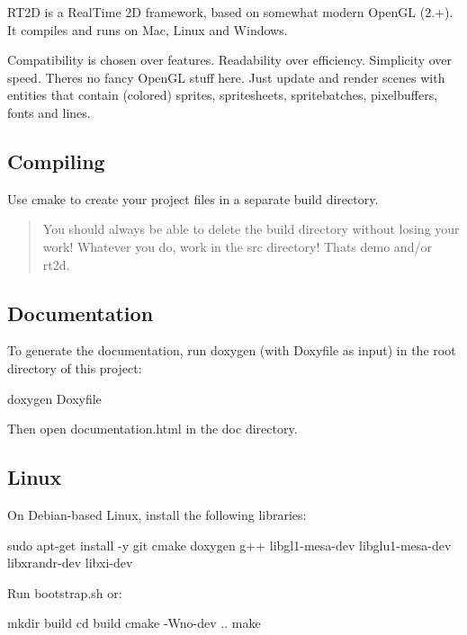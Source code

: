 R\+T2D is a Real\+Time 2D framework, based on somewhat \textquotesingle{}modern\textquotesingle{} Open\+GL (2.+). It compiles and runs on Mac, Linux and Windows.

Compatibility is chosen over features. Readability over efficiency. Simplicity over speed. There\textquotesingle{}s no fancy Open\+GL stuff here. Just update and render scenes with entities that contain (colored) sprites, spritesheets, spritebatches, pixelbuffers, fonts and lines.

\subsection*{Compiling }

Use cmake to create your project files in a separate {\ttfamily build} directory.

\begin{quote}
You should always be able to delete the {\ttfamily build} directory without losing your work! Whatever you do, work in the {\ttfamily src} directory! That\textquotesingle{}s {\ttfamily demo} and/or {\ttfamily rt2d}. \end{quote}


\subsection*{Documentation }

To generate the documentation, run doxygen (with Doxyfile as input) in the root directory of this project\+: \begin{DoxyVerb}doxygen Doxyfile
\end{DoxyVerb}


Then open {\ttfamily documentation.\+html} in the {\ttfamily doc} directory.

\subsection*{Linux }

On Debian-\/based Linux, install the following libraries\+: \begin{DoxyVerb}sudo apt-get install -y git cmake doxygen g++ libgl1-mesa-dev libglu1-mesa-dev libxrandr-dev libxi-dev
\end{DoxyVerb}


Run {\ttfamily bootstrap.\+sh} or\+: \begin{DoxyVerb}mkdir build
cd build
cmake -Wno-dev ..
make
\end{DoxyVerb}


